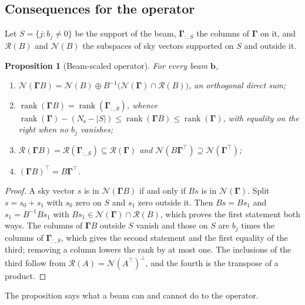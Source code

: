 \documentclass[11pt,a4paper]{article}
\newtheorem{proposition}{Proposition}
\newcommand{\Ns}{N_{\mathrm{s}}}
\newcommand{\Gammam}{\boldsymbol{\Gamma}}
\newcommand{\bvec}{\boldsymbol{b}}
\newcommand{\Gammab}{\Gammam B}
\begin{document}
\subsection{Consequences for the operator}
\label{sec:beamop}

Let $S=\{j:b_j\neq0\}$ be the support of the beam, $\Gammam_{:,S}$ the
columns of $\Gammam$ on it, and $\mathcal{R}(B)$ and $\mathcal{N}(B)$ the
subspaces of sky vectors supported on $S$ and outside it.

\begin{proposition}[Beam-scaled operator]
\label{prop:beam}
For every beam $\bvec$,
\begin{enumerate}
\item $\mathcal{N}(\Gammab)
      =\mathcal{N}(B)\oplus B^{-1}\big(\mathcal{N}(\Gammam)\cap\mathcal{R}(B)\big)$,
      an orthogonal direct sum;
\item $\operatorname{rank}(\Gammab)=\operatorname{rank}(\Gammam_{:,S})$, whence
      $\operatorname{rank}(\Gammam)-(\Ns-|S|)
      \le\operatorname{rank}(\Gammab)\le\operatorname{rank}(\Gammam)$, with
      equality on the right when no $b_j$ vanishes;
\item $\mathcal{R}(\Gammab)=\mathcal{R}(\Gammam_{:,S})\subseteq\mathcal{R}(\Gammam)$
      and $\mathcal{N}(B\Gammam^{\!\top})\supseteq\mathcal{N}(\Gammam^{\!\top})$;
\item $(\Gammab)^{\!\top}=B\Gammam^{\!\top}$.
\end{enumerate}
\end{proposition}

\begin{proof}
A sky vector $s$ is in $\mathcal{N}(\Gammab)$ if and only if $Bs$ is in
$\mathcal{N}(\Gammam)$. Split $s=s_0+s_1$ with $s_0$ zero on $S$ and $s_1$
zero outside it. Then $Bs=Bs_1$ and $s_1=B^{-1}Bs_1$ with
$Bs_1\in\mathcal{N}(\Gammam)\cap\mathcal{R}(B)$, which proves the first
statement both ways. The columns of $\Gammab$ outside $S$ vanish and those
on $S$ are $b_j$ times the columns of $\Gammam_{:,S}$, which gives the second
statement and the first equality of the third; removing a column lowers the
rank by at most one. The inclusions of the third follow from
$\mathcal{R}(A)=\mathcal{N}(A^{\!\top})^{\perp}$, and the fourth is the
transpose of a product.
\end{proof}

The proposition says what a beam can and cannot do to the operator.
\end{document}
